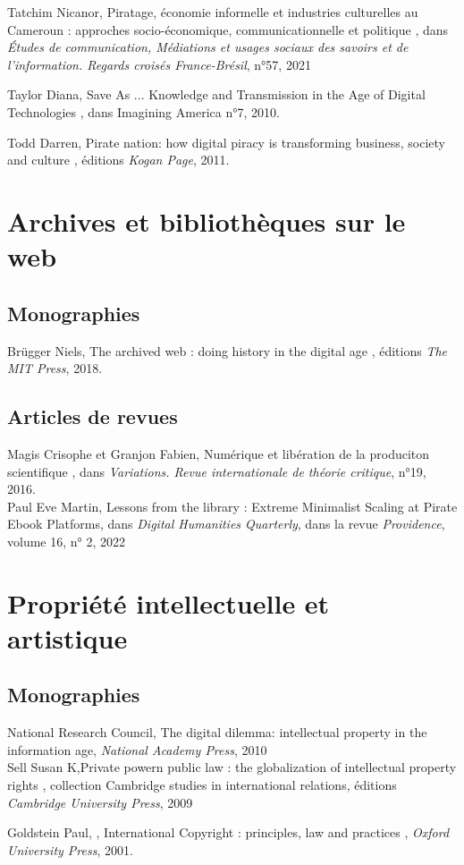 Tatchim Nicanor, \og Piratage, économie informelle et industries culturelles au Cameroun : approches socio-économique, communicationnelle et politique \fg, dans \textit{Études de communication, Médiations et usages sociaux des savoirs et de  l’information. Regards croisés France-Brésil}, n°57, 2021

Taylor Diana, \og Save As ... Knowledge and Transmission in the Age of Digital Technologies \fg, dans Imagining America n°7, 2010. 

Todd Darren, \og Pirate nation: how digital piracy is transforming business, society and culture \fg, éditions \textit{Kogan Page}, 2011. 

\section*{Archives et bibliothèques sur le web}

\subsection*{Monographies}

Brügger Niels, \og The archived web : doing history in the digital age \fg, éditions \textit{The MIT Press}, 2018. 

\subsection*{Articles de revues}

Magis Crisophe et Granjon Fabien, \og Numérique et libération de la produciton scientifique \fg, dans \textit{Variations. Revue internationale de théorie critique}, n°19, 2016. \\

Paul Eve Martin, \guillemetleft Lessons from the library : Extreme Minimalist Scaling at Pirate Ebook Platforms\guillemetright, dans \textit{Digital Humanities Quarterly}, dans la revue \textit{Providence}, volume 16, n° 2, 2022\\

\section*{Propriété intellectuelle et artistique}

\subsection*{Monographies}

National Research Council, \og The digital dilemma: intellectual property in the information age\og, \textit{National Academy Press}, 2010 \\

Sell Susan K,\og Private powern public law : the globalization of intellectual property rights \fg, collection Cambridge studies in international relations, éditions \textit{Cambridge University Press}, 2009

Goldstein Paul, \og, International Copyright : principles, law and practices \fg, \textit{Oxford University Press}, 2001. 